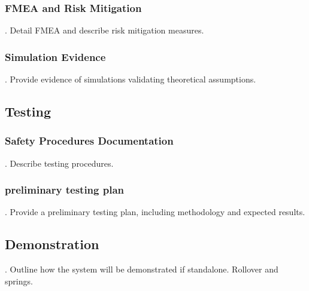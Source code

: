 \documentclass{article}
\begin{document}
\subsubsection{FMEA and Risk Mitigation}
.  Detail FMEA and describe risk mitigation measures.
\subsubsection{Simulation Evidence}
.  Provide evidence of simulations validating theoretical assumptions.


\subsection{Testing}
\subsubsection{Safety Procedures Documentation}
.  Describe testing procedures.
\subsubsection{preliminary testing plan}
.  Provide a preliminary testing plan, including methodology and expected results.


\subsection{Demonstration}
.  Outline how the system will be demonstrated if standalone. Rollover and springs.
\end{document}
